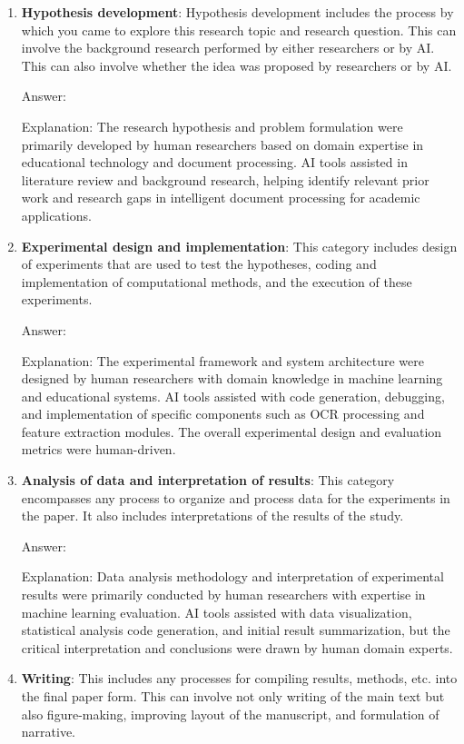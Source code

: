 \documentclass{article}
\begin{document}
\begin{enumerate}
    \item \textbf{Hypothesis development}: Hypothesis development includes the process by which you came to explore this research topic and research question. This can involve the background research performed by either researchers or by AI. This can also involve whether the idea was proposed by researchers or by AI.

    Answer: \involvementB{}

    Explanation: The research hypothesis and problem formulation were primarily developed by human researchers based on domain expertise in educational technology and document processing. AI tools assisted in literature review and background research, helping identify relevant prior work and research gaps in intelligent document processing for academic applications.

    \item \textbf{Experimental design and implementation}: This category includes design of experiments that are used to test the hypotheses, coding and implementation of computational methods, and the execution of these experiments.

    Answer: \involvementB{}

    Explanation: The experimental framework and system architecture were designed by human researchers with domain knowledge in machine learning and educational systems. AI tools assisted with code generation, debugging, and implementation of specific components such as OCR processing and feature extraction modules. The overall experimental design and evaluation metrics were human-driven.

    \item \textbf{Analysis of data and interpretation of results}: This category encompasses any process to organize and process data for the experiments in the paper. It also includes interpretations of the results of the study.

    Answer: \involvementB{}

    Explanation: Data analysis methodology and interpretation of experimental results were primarily conducted by human researchers with expertise in machine learning evaluation. AI tools assisted with data visualization, statistical analysis code generation, and initial result summarization, but the critical interpretation and conclusions were drawn by human domain experts.

    \item \textbf{Writing}: This includes any processes for compiling results, methods, etc. into the final paper form. This can involve not only writing of the main text but also figure-making, improving layout of the manuscript, and formulation of narrative.


\end{enumerate}
\end{document}
